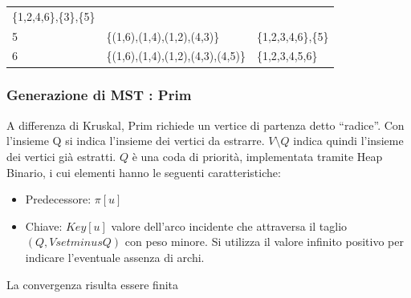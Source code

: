 \documentclass{article}
\providecommand{\tightlist}{%
  \setlength{\itemsep}{0pt}\setlength{\parskip}{0pt}}
\begin{document}
{{\begin{longtable}[]{@{}lll@{}}
\begin{minipage}[t]{0.30\columnwidth}
{\{1,2,4,6\},\{3\},\{5\}}\strut
\end{minipage}\tabularnewline
\begin{minipage}[t]{0.30\columnwidth}\raggedright\strut
{5}\strut
\end{minipage} & \begin{minipage}[t]{0.30\columnwidth}\raggedright\strut
{\{(1,6),(1,4),(1,2),(4,3)\}}\strut
\end{minipage} & \begin{minipage}[t]{0.30\columnwidth}\raggedright\strut
{\{1,2,3,4,6\},\{5\}}\strut
\end{minipage}\tabularnewline
\begin{minipage}[t]{0.30\columnwidth}\raggedright\strut
{6}\strut
\end{minipage} & \begin{minipage}[t]{0.30\columnwidth}\raggedright\strut
{\{(1,6),(1,4),(1,2),(4,3),(4,5)\}}\strut
\end{minipage} & \begin{minipage}[t]{0.30\columnwidth}\raggedright\strut
{\{1,2,3,4,5,6\}}\strut
\end{minipage}\tabularnewline
\bottomrule
\end{longtable}

\hypertarget{h.l5wypo8krmqc}{\subsubsection{\texorpdfstring{{Generazione di MST : Prim}}{Generazione di MST : Prim}}\label{h.l5wypo8krmqc}}

{A differenza di Kruskal, Prim richiede un vertice di partenza detto ``radice''. Con l'insieme Q si indica l'insieme dei vertici da estrarre.
$V\setminus Q$ indica quindi l'insieme dei vertici già estratti. $Q$ è una coda di priorità, implementata tramite Heap Binario, i cui elementi hanno le seguenti caratteristiche:}

\begin{itemize}
\tightlist
\item
  Predecessore: $\pi[u]$
\item
Chiave: $Key[u]$ valore dell'arco incidente che attraversa il taglio $(Q,Vsetminus Q)$ con peso minore. Si utilizza il valore infinito positivo per indicare l'eventuale assenza di archi.
\end{itemize}



La convergenza risulta essere finita

}}
\end{document}

